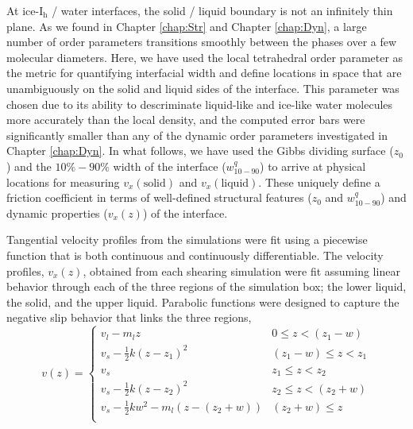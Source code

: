 At ice-I$_\mathrm{h}$ / water interfaces, the solid / liquid boundary
is not an infinitely thin plane. As we found in Chapter \ref{chap:Str}
and Chapter \ref{chap:Dyn}, a large number of order parameters
transitions smoothly between the phases over a few molecular
diameters.  Here, we have used the local tetrahedral order parameter
as the metric for quantifying interfacial width and define locations
in space that are unambiguously on the solid and liquid sides of the
interface. This parameter was chosen due to its ability to
descriminate liquid-like and ice-like water molecules more accurately
than the local density, and the computed error bars were
significantly smaller than any of the dynamic order parameters
investigated in Chapter \ref{chap:Dyn}. In what follows, we have used
the Gibbs dividing surface ($z_0$) and the $10\%-90\%$ width of the
interface ($w_\mathrm{10-90}^{q}$) to arrive at physical locations for
measuring $v_{x}(\mathrm{solid})$ and $v_{x}(\mathrm{liquid})$.  These
uniquely define a friction coefficient in terms of well-defined
structural features ($z_0$ and $w_\mathrm{10-90}^{q}$) and dynamic
properties ($v_{x}(z)$) of the interface.

Tangential velocity profiles from the simulations were fit using a
piecewise function that is both continuous and continuously
differentiable. The velocity profiles, $v_x(z)$, obtained from each
shearing simulation were fit assuming linear behavior through each of
the three regions of the simulation box; the lower liquid, the solid,
and the upper liquid. Parabolic functions were designed to capture the
negative slip behavior that links the three regions,
\begin{equation}\label{eq:vfit}
v(z) =
\begin{cases}
  v_{l} - m_{l}z & 0 \leq z < (z_{1} - w) \\
  v_{s} - \frac{1}{2}k(z-z_{1})^{2} & (z_{1}-w) \leq z < z_{1} \\
  v_{s}  & z_{1} \leq z < z_{2} \\
  v_{s} - \frac{1}{2}k(z-z_{2})^{2}  & z_{2} \leq z <( z_{2} + w)\\
  v_{s} - \frac{1}{2}kw^{2} - m_{l}(z-(z_{2} + w)) & (z_{2} + w) \leq z \\
\end{cases}
\end{equation}
  
